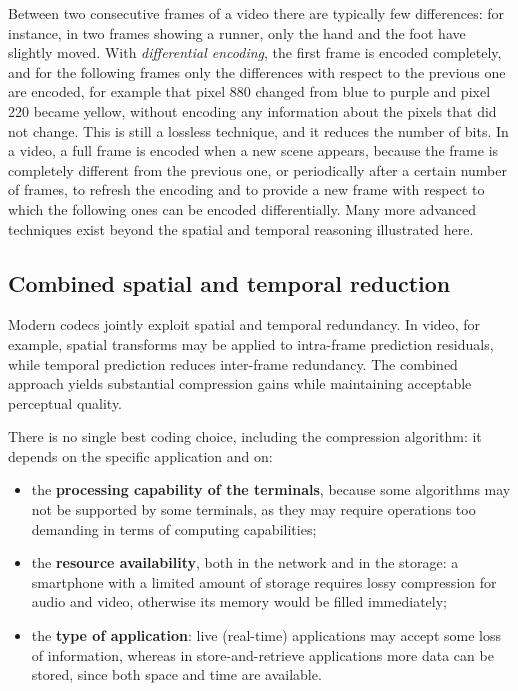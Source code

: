 \documentclass[11pt,a4paper,openany]{report}
\begin{document}
Between two consecutive frames of a video there are typically few differences: for instance, in two frames showing a runner, only the hand and the foot have slightly moved. With \emph{differential encoding}, the first frame is encoded completely, and for the following frames only the differences with respect to the previous one are encoded, for example that pixel 880 changed from blue to purple and pixel 220 became yellow, without encoding any information about the pixels that did not change. This is still a lossless technique, and it reduces the number of bits. In a video, a full frame is encoded when a new scene appears, because the frame is completely different from the previous one, or periodically after a certain number of frames, to refresh the encoding and to provide a new frame with respect to which the following ones can be encoded differentially. Many more advanced techniques exist beyond the spatial and temporal reasoning illustrated here.

\subsection{Combined spatial and temporal reduction}

Modern codecs jointly exploit spatial and temporal redundancy. In video, for example, spatial transforms may be applied to intra-frame prediction residuals, while temporal prediction reduces inter-frame redundancy. The combined approach yields substantial compression gains while maintaining acceptable perceptual quality.

There is no single best coding choice, including the compression algorithm: it depends on the specific application and on:
\begin{itemize}
	\item the \textbf{processing capability of the terminals}, because some algorithms may not be supported by some terminals, as they may require operations too demanding in terms of computing capabilities;
	\item the \textbf{resource availability}, both in the network and in the storage: a smartphone with a limited amount of storage requires lossy compression for audio and video, otherwise its memory would be filled immediately;
	\item the \textbf{type of application}: live (real-time) applications may accept some loss of information, whereas in store-and-retrieve applications more data can be stored, since both space and time are available.
\end{itemize}
\end{document}
